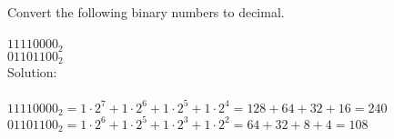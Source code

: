 Convert the following binary numbers to decimal. \\
\\
$11110000_2$ \\
$01101100_2$ \\

Solution: \\
\\
$11110000_2 = 1 \cdot 2^7 + 1 \cdot 2^6 + 1 \cdot 2^5 + 1 \cdot 2^4 = 128 + 64 + 32 + 16 = 240$ \\
$01101100_2 = 1 \cdot 2^6 + 1 \cdot 2^5 + 1 \cdot 2^3 + 1 \cdot 2^2 = 64 + 32 + 8 + 4 = 108$ \\

